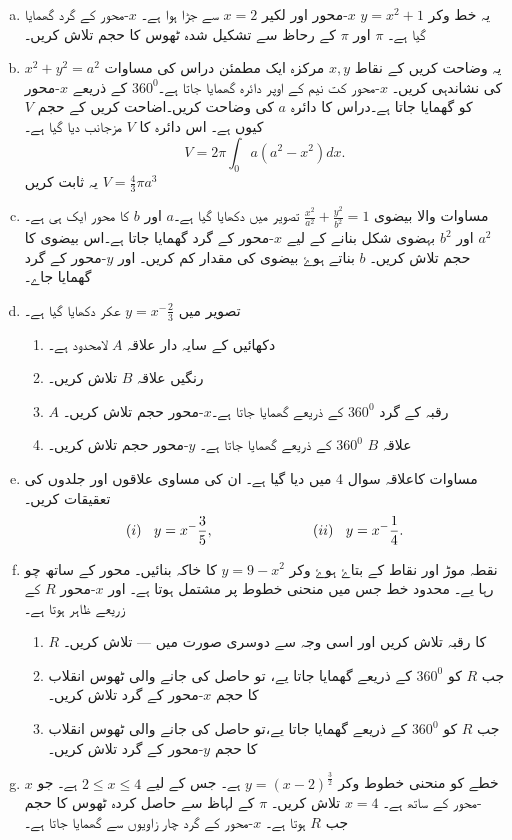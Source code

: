 \begin{enumerate}[a.]
\item
یہ خط وکر \(y=x^{2}+1 \) \(x\)-محور اور لکیر \( x=2\) سے جڑا ہوا ہے۔ \(x\)-محور کے گرد گھمایا گیا ہے۔ \(\pi \) اور \(\pi \) کے رحاظ سے تشکیل شدہ ٹھوس کا حجم تلاش کریں۔
\item
یہ وضاحت کریں کے نقاط \(x,y\) مرکزہ ایک مطمئن دراس کی مساوات \(x^{2}+y^{2}=a^{2} \) کی نشاندہی کریں۔ \(x\)-محور کت نیم کے اوپر دائرہ گھمایا جاتا ہے۔\(360^0\) کے ذریعے \(x\)-محور کو گھمایا جاتا ہے۔دراس کا دائرہ \(a\) کی وضاحت کریں۔اضاحت کریں کے حجم \(V\) کیوں ہے۔ اس دائرہ کا \(V\) مزجانب دیا گیا ہے۔
\[V=2 \pi \int_{0}{a} (a^{2}-x^{2})dx. \]
یہ ثابت کریں \(V=\frac{4}{3} \pi a^{3} \)
\item
مساوات والا بیضوی \(\frac {x^{2}}{a^{2}} + \frac {y^{2}}{b^{2}}=1 \)  تصویر میں دکھایا گیا ہے۔\(a\) اور \(b\) کا محور ایک ہی ہے۔ \(a^{2}\) اور \(b^{2}\) بہضوی شکل بنانے کے لیے \(x\)-محور کے گرد گھمایا جاتا ہے۔اس بیضوی کا حجم تلاش کریں۔ \(b\) بناتے ہوۓ بیضوی کی مقدار کم کریں۔ اور \(y\)-محور کے گرد گھمایا جاے۔

\item
تصویر میں \(y=x^-{\frac{2}{3}}\) عکر دکھایا گیا ہے۔
\begin{enumerate}
\item
دکھائیں کے سایہ دار علاقہ \(A\) لامحدود ہے۔
\item
رنگیں علاقہ \(B\) تلاش کریں۔
\item
\(A\)
 رقبہ کے گرد \(360^0\)  کے ذریعے گھمایا جاتا ہے۔\(x\)-محور حجم تلاش کریں۔
\item
علاقہ \(B\) \(360^0\) کے ذریعے گھمایا جاتا ہے۔ \(y\)-محور حجم تلاش کریں۔
\end{enumerate}
\item
مساوات کاعلاقہ سوال 4 میں دیا گیا ہے۔ ان کی مساوی علاقوں اور جلدوں کی تعقیقات کریں۔
\[(i)\>\>\>\>y=x^-{\frac{3}{5}},  \hspace{2.5cm} (ii)\>\>\>\>y=x^-{\frac{1}{4}}.\]
\item
نقطہ موڑ اور نقاط کے بتاۓ ہوۓ وکر \(y=9-x^{2} \) کا خاکہ بنائیں۔ محور کے ساتھ چو رہا یے۔ محدود خط جس میں منحنی خطوط پر مشتمل ہوتا ہے۔ اور \(x\)-محور \(R\) کے زریعے ظاہر ہوتا ہے۔
\begin{enumerate}
\item
 \(R\)
کا رقبہ تلاش کریں اور اسی وجہ سے دوسری صورت میں --- تلاش کریں۔
\item
جب \(R\) کو \(360^0\) کے ذریعے گھمایا جاتا یے، تو حاصل کی جانے والی ٹھوس  انقلاب کا حجم \(x\)-محور کے گرد تلاش کریں۔
\item
جب \(R\) کو \(360^0\) کے ذریعے گھمایا جاتا یے،تو حاصل کی جانے والی ٹھوس  انقلاب کا حجم \(y\)-محور کے گرد تلاش کریں۔
\end{enumerate}
\item
خطے کو منحنی خطوط وکر \(y=(x-2)^{\frac{3}{2}}\) ہے۔ جس کے لیے \(2 \le x \le 4\) ہے۔ جو \(x\)-محور کے ساتھ ہے۔ \(x=4\) تلاش کریں۔ \(\pi\) کے لہاظ سے حاصل کردہ ٹھوس کا حجم جب \(R\) ہوتا ہے۔ \(x\)-محور کے گرد چار زاویوں سے گھمایا جاتا ہے۔
\end{enumerate}
